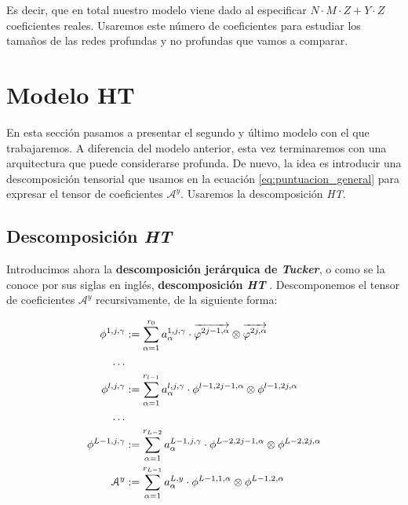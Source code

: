 Es decir, que en total nuestro modelo viene dado al especificar $N \cdot M \cdot Z + Y \cdot Z$ coeficientes reales. Usaremos este número de coeficientes para estudiar los tamaños de las redes profundas y no profundas que vamos a comparar.

\section{Modelo HT} \label{sec:modelo_ht}

En esta sección pasamos a presentar el segundo y último modelo con el que trabajaremos. A diferencia del modelo anterior, esta vez terminaremos con una arquitectura que puede considerarse profunda. De nuevo, la idea es introducir una descomposición tensorial que usamos en la ecuación \eqref{eq:puntuacion_general} para expresar el tensor de coeficientes $\mathcal{A}^y$. Usaremos la descomposición \textit{HT}.

\subsection{Descomposición \textit{HT}} \label{subs:descomposicion_ht}

Introducimos ahora la \textbf{descomposición jerárquica de \textit{Tucker}}, o como se la conoce por sus siglas en inglés, \textbf{descomposición \textit{HT}} \cite{matematicas:descomposicion_ht} \cite{matematicas:principal}. Descomponemos el tensor de coeficientes $\mathcal{A}^y$ recursivamente, de la siguiente forma:

\begin{equation} \label{eq:descomposicion_ht}
	\begin{split}
		\phi^{1, j, \gamma} &:= \sum_{\alpha = 1}^{r_0} a_{\alpha}^{1, j, \gamma} \cdot \overrightarrow{\varphi^{2j-1, \alpha}} \otimes \overrightarrow{\varphi^{2j, \alpha}} \\
		\ldots \\
		\phi^{l, j, \gamma} &:= \sum_{\alpha = 1}^{r_{l-1}} a_{\alpha}^{l, j, \gamma} \cdot \phi^{l-1, 2j-1, \alpha} \otimes \phi^{l-1, 2j, \alpha} \\
		\ldots \\
		\phi^{L - 1, j, \gamma} &:= \sum_{\alpha = 1}^{r_{L-2}} a_{\alpha}^{L - 1, j, \gamma} \cdot \phi^{L-2, 2j-1, \alpha} \otimes \phi^{L-2, 2j, \alpha} \\
		\mathcal{A}^y &:= \sum_{\alpha = 1}^{r_{L-1}} a_{\alpha}^{L, y} \cdot \phi^{L-1, 1, \alpha} \otimes \phi^{L-1, 2, \alpha}
	\end{split}
\end{equation}

